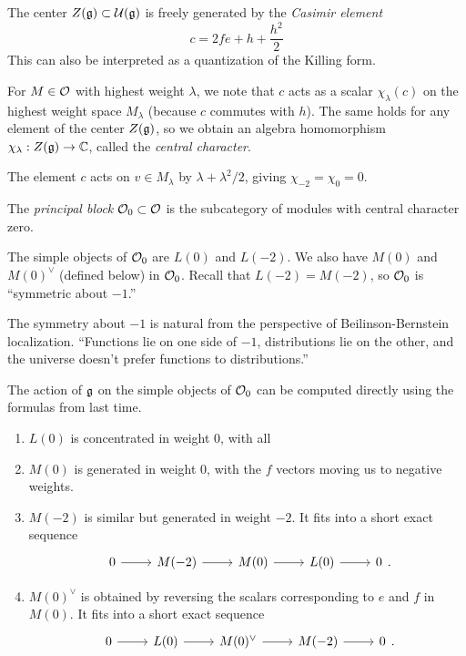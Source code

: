 \documentclass{article}
\begin{document}
The center $Z(\mathfrak{g}) \subset \mathcal{U}(\mathfrak{g})$ is freely generated by the \emph{Casimir element} 
\[
	c = 2fe + h + \frac{h^2}{2}
\]
This can also be interpreted as a quantization of the Killing form.

For $M \in \mathcal{O}$ with highest weight $\lambda$, we note that $c$ acts as a scalar $\chi_\lambda(c)$ on the highest weight space $M_\lambda$ (because $c$ commutes with $h$).
The same holds for any element of the center $Z(\mathfrak{g})$, so we obtain an algebra homomorphism $\chi_\lambda: Z(\mathfrak{g}) \to \mathbb{C}$, called the \emph{central character}.

\begin{ex}
	The element $c$ acts on $v \in M_\lambda$ by $\lambda + \lambda^2 / 2$, giving $\chi_{-2} = \chi_0 = 0$.
\end{ex}

\begin{dfn}
	The \emph{principal block} $\mathcal{O}_0 \subset \mathcal{O}$ is the subcategory of modules with central character zero.
\end{dfn}

The simple objects of $\mathcal{O}_0$ are $L(0)$ and $L(-2)$.
We also have $M(0)$ and $M(0)^\vee$ (defined below) in $\mathcal{O}_0$.
Recall that $L(-2) = M(-2)$, so $\mathcal{O}_0$ is ``symmetric about $-1$.''

\begin{rmk}
	The symmetry about $-1$ is natural from the perspective of Beilinson-Bernstein localization.
	``Functions lie on one side of $-1$, distributions lie on the other, and the universe doesn't prefer functions to distributions.''
\end{rmk}

\begin{ex}
	The action of $\mathfrak{g}$ on the simple objects of $\mathcal{O}_0$ can be computed directly using the formulas from last time.
	\begin{enumerate}
		\item $L(0)$ is concentrated in weight $0$, with all 
		\item $M(0)$ is generated in weight $0$, with the $f$ vectors moving us to negative weights.
		\item $M(-2)$ is similar but generated in weight $-2$.
			It fits into a short exact sequence
			\[
				\SES{M(-2)}{M(0)}{L(0)}.
			\]
		\item $M(0)^\vee$ is obtained by reversing the scalars corresponding to $e$ and $f$ in $M(0)$.
			It fits into a short exact sequence
			\[
				\SES{L(0)}{M(0)^\vee}{M(-2)}.
			\]
	\end{enumerate}
\end{ex}
\end{document}
